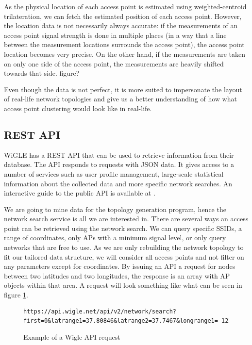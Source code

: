 	As the physical location of each access point is estimated using weighted-centroid trilateration, 
	we can fetch the estimated position of each access point. However, the location data is not necessarily always accurate: if the measurements of an access point signal
	strength is done in multiple places (in a way that a line between the measurement locations surrounds the access point), the access point location becomes very precise. 
	On the other hand, if the measurements are taken on only one side of the access point, the measurements are heavily shifted towards that side. {{figure?}} 
	
	Even though the data is not perfect, it is more suited to impersonate the layout of real-life network topologies and give us a better understanding of how what access point
	clustering would look like in real-life. 



	\subsection{REST API}
	WiGLE has a REST API that can be used to retrieve information from their database. The API responds to requests with JSON data. It gives access to a
	number of services such as user profile management, large-scale statistical information about the collected data
	and more specific network searches. An interactive guide to the public API is available at \cite{WigleAPI}. 

	We are going to mine data for the topology generation program, hence the network search service is all we are interested in. There are several ways an access point can be retrieved using
	the network search. We can query specific SSIDs, a range of coordinates, only APs with a minimum signal level, or only query networks that are free to use. As 
	we are only rebuilding the network topology to fit our tailored data structure, we will consider all access points and not filter on any parameters except for coordinates.
	By issuing an API a request for nodes between two latitudes and two longitudes, the response is an array with AP objects within that area.  
	A request will look something like what can be seen in figure \ref{fig:wigReq}.
	\begin{figure}
	\scriptsize
	\begin{lstlisting}[breaklines]
	 https://api.wigle.net/api/v2/network/search?first=0&latrange1=37.80846&latrange2=37.7467&longrange1=-122.5392&longrange2=-122.3813&start=0
	\end{lstlisting}
	\caption{Example of a Wigle API request}
	\label{fig:wigReq}
	\end{figure}

